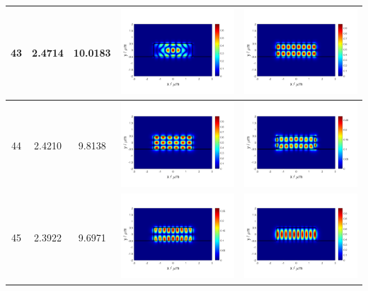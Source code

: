 \documentclass{assignment}
\begin{document}
\begin{sol}
\begin{itemize}
\begin{longtable}[c]{|c|c|c|c|c|}
            43 & 2.4714 & 10.0183 & \includegraphics[width=.3\columnwidth]{Assignment-2-mode-43-Ex.png} & \includegraphics[width=.3\columnwidth]{Assignment-2-mode-43-Ey.png} \\ \hline
            44 & 2.4210 & 9.8138 & \includegraphics[width=.3\columnwidth]{Assignment-2-mode-44-Ex.png} & \includegraphics[width=.3\columnwidth]{Assignment-2-mode-44-Ey.png} \\ \hline
            45 & 2.3922 & 9.6971 & \includegraphics[width=.3\columnwidth]{Assignment-2-mode-45-Ex.png} & \includegraphics[width=.3\columnwidth]{Assignment-2-mode-45-Ey.png} \\ \hline

\end{longtable}
\end{itemize}
\end{sol}
\end{document}
